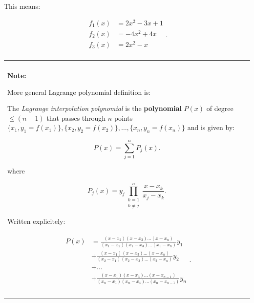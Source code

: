 \documentclass[10pt,b5paper,titlepage]{book}
\newenvironment{bbox}[1][1.0]
{
    \begin{center}
        \begin{tabular}{|p{#1\textwidth}|}
            \hline\\
}
{
            \\\\\hline
        \end{tabular}
    \end{center}
}
\begin{document}
This means:

\begin{equation}
    \begin{array}{ll}
        f_{1}(x) &= 2 x^{2} - 3 x + 1 \\
        f_{2}(x) &= -4 x^{2} + 4 x \\
        f_{3}(x) &= 2 x^{2} - x \\
    \end{array}
.\end{equation}

\begin{bbox}

    \textbf{Note:}

    More general Lagrange polynomial definition is:

    The \textit{Lagrange interpolation polynomial} is the \textbf{polynomial}
    $P(x)$ of degree $\leq (n - 1)$ that passes through $n$ points
$\{x_1, y_1 = f(x_1)\}, \{x_2, y_2 = f(x_2)\}, \ldots, \{x_{n}, y_{n} = f(x_{n})\}$
    and is given by:

    \begin{equation}
        P(x) = \sum_{j=1}^{n} P_{j}(x)
    .\end{equation}

    where

    \begin{equation}
        P_{j}(x) = y_{j} \prod_{\begin{array}{ll}
             k = 1 \\
             k \neq j
        \end{array}}^{n} \frac{x - x_{k}}{x_{j} - x_{k}}
    .\end{equation}

    Written explicitely:

    \begin{eqnarray}
        \begin{aligned}
            P(x)
            &= \frac{(x - x_2)(x - x_3)\ldots(x - x_{n})}
            {(x_1 - x_2)(x_1 - x_3)\ldots(x_1 - x_{n})} y_1 \\
            &+ \frac{(x - x_1)(x - x_3)\ldots(x - x_{n})}
            {(x_2 - x_1)(x_2 - x_3)\ldots(x_2 - x_{n})} y_2 \\
            &+ \ldots \\
            &+ \frac{(x - x_1)(x - x_3)\ldots(x - x_{n-1})}
            {(x_{n} - x_1)(x_{n} - x_4)\ldots(x_{n} - x_{n-1})} y_{n}
        \end{aligned}
    .\end{eqnarray}
\end{bbox}
\end{document}

